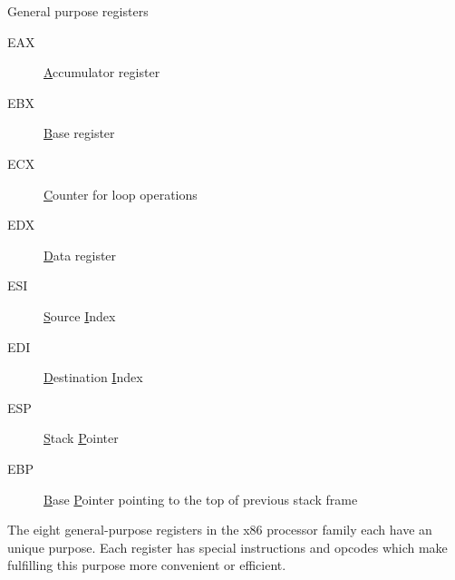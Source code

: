 \begin{frame}
  \begin{block}{General purpose registers}
    \begin{multicols}{2}
      \begin{description}
      \item[EAX] \uline{A}ccumulator register
      \item[EBX] \uline{B}ase register
      \item[ECX] \uline{C}ounter for loop operations
      \item[EDX] \uline{D}ata register
        \columnbreak
      \item[ESI] \uline{S}ource \uline{I}ndex
      \item[EDI] \uline{D}estination \uline{I}ndex
      \item[ESP] \uline{S}tack \uline{P}ointer
      \item[EBP] \uline{B}ase \uline{P}ointer pointing to the top of previous stack frame
      \end{description}
    \end{multicols}
  \end{block}
\end{frame}

The eight general-purpose registers in the x86 processor family each have an unique
purpose. Each register has special instructions and opcodes which make fulfilling this
purpose more convenient or efficient. 

